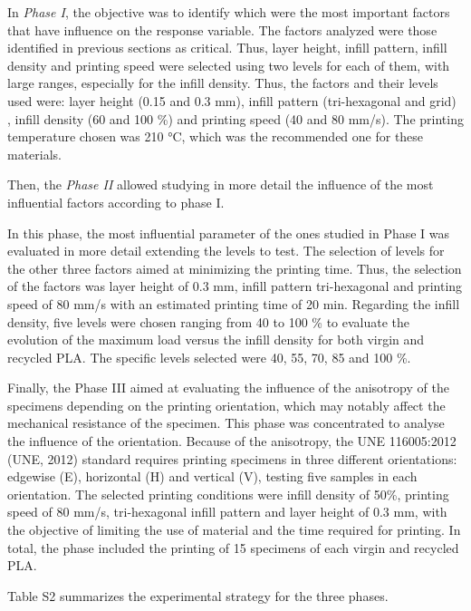 \documentclass[conference,final,]{IEEEtran}
\begin{document}
In \emph{Phase I}, the objective was to identify which were the most
important factors that have influence on the response variable. The
factors analyzed were those identified in previous sections as critical.
Thus, layer height, infill pattern, infill density and printing speed
were selected using two levels for each of them, with large ranges,
especially for the infill density. Thus, the factors and their levels
used were: layer height (0.15 and 0.3 mm), infill pattern (tri-hexagonal
and grid) , infill density (60 and 100 \%) and printing speed (40 and 80
mm/s). The printing temperature chosen was 210 °C, which was the
recommended one for these materials.

Then, the \emph{Phase II} allowed studying in more detail the influence
of the most influential factors according to phase I.

In this phase, the most influential parameter of the ones studied in
Phase I was evaluated in more detail extending the levels to test. The
selection of levels for the other three factors aimed at minimizing the
printing time. Thus, the selection of the factors was layer height of
0.3 mm, infill pattern tri-hexagonal and printing speed of 80 mm/s with
an estimated printing time of 20 min. Regarding the infill density, five
levels were chosen ranging from 40 to 100 \% to evaluate the evolution
of the maximum load versus the infill density for both virgin and
recycled PLA. The specific levels selected were 40, 55, 70, 85 and 100
\%.

Finally, the Phase III aimed at evaluating the influence of the
anisotropy of the specimens depending on the printing orientation, which
may notably affect the mechanical resistance of the specimen. This phase
was concentrated to analyse the influence of the orientation. Because of
the anisotropy, the UNE 116005:2012 (UNE, 2012) standard requires
printing specimens in three different orientations: edgewise (E),
horizontal (H) and vertical (V), testing five samples in each
orientation. The selected printing conditions were infill density of
50\%, printing speed of 80 mm/s, tri-hexagonal infill pattern and layer
height of 0.3 mm, with the objective of limiting the use of material and
the time required for printing. In total, the phase included the
printing of 15 specimens of each virgin and recycled PLA.

Table S2 summarizes the experimental strategy for the three phases.
\end{document}
